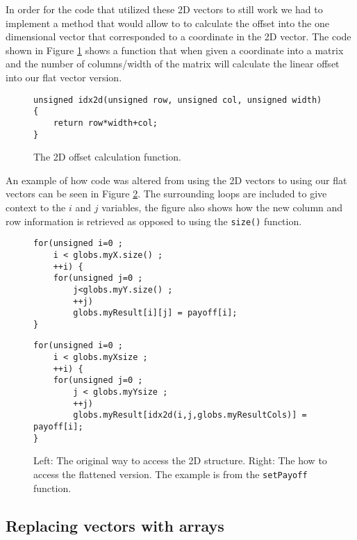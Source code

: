 In order for the code that utilized these 2D vectors to still work we had to
implement a method that would allow to to calculate the offset into the one
dimensional vector that corresponded to a coordinate in the 2D vector. The code
shown in Figure \ref{code:idx2d} shows a function that when given a coordinate
into a matrix and the number of columns/width of the matrix will calculate the
linear offset into our flat vector version.

\begin{figure}[H]
    \begin{lstlisting}
unsigned idx2d(unsigned row, unsigned col, unsigned width) {
    return row*width+col;
}
    \end{lstlisting}
    \caption{The 2D offset calculation function.}
    \label{code:idx2d}
\end{figure}

An example of how code was altered from using the 2D vectors to using our flat
vectors can be seen in Figure \ref{code:2dto1dcoord}. The surrounding loops are
included to give context to the $i$ and $j$ variables, the figure also shows how
the new column and row information is retrieved as opposed to using the
\texttt{size()} function.

\begin{figure}[H]
    \begin{minipage}{.45\textwidth}
        \begin{lstlisting}
for(unsigned i=0 ;
    i < globs.myX.size() ;
    ++i) {
    for(unsigned j=0 ;
        j<globs.myY.size() ;
        ++j) 
        globs.myResult[i][j] = payoff[i];
}
        \end{lstlisting}
    \end{minipage}\hfill
    \begin{minipage}{.45\textwidth}
        \begin{lstlisting}
for(unsigned i=0 ;
    i < globs.myXsize ;
    ++i) {
    for(unsigned j=0 ;
        j < globs.myYsize ;
        ++j) 
        globs.myResult[idx2d(i,j,globs.myResultCols)] = payoff[i];
}
        \end{lstlisting}
    \end{minipage}
    \caption{Left: The original way to access the 2D structure. Right: The how
    to access the flattened version. The example is from the
    \texttt{setPayoff} function.}
    \label{code:2dto1dcoord}
\end{figure}


\subsection{Replacing vectors with arrays}